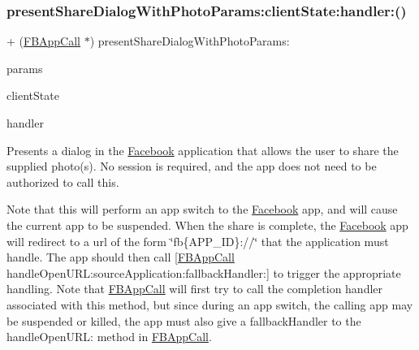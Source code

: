 \subsubsection{\texorpdfstring{present\+Share\+Dialog\+With\+Photo\+Params\+:client\+State\+:handler\+:()}{presentShareDialogWithPhotoParams:clientState:handler:()}\hspace{0.1cm}{\footnotesize\ttfamily [2/5]}}
{\footnotesize\ttfamily + (\hyperlink{interfaceFBAppCall}{F\+B\+App\+Call} $\ast$) present\+Share\+Dialog\+With\+Photo\+Params\+: \begin{DoxyParamCaption}\item[{(\hyperlink{interfaceFBPhotoParams}{F\+B\+Photo\+Params} $\ast$)}]{params }\item[{clientState:(N\+S\+Dictionary $\ast$)}]{client\+State }\item[{handler:(F\+B\+Dialog\+App\+Call\+Completion\+Handler)}]{handler }\end{DoxyParamCaption}}

Presents a dialog in the \hyperlink{interfaceFacebook}{Facebook} application that allows the user to share the supplied photo(s). No session is required, and the app does not need to be authorized to call this.

Note that this will perform an app switch to the \hyperlink{interfaceFacebook}{Facebook} app, and will cause the current app to be suspended. When the share is complete, the \hyperlink{interfaceFacebook}{Facebook} app will redirect to a url of the form \char`\"{}fb\{\+A\+P\+P\+\_\+\+I\+D\}\+://\char`\"{} that the application must handle. The app should then call \mbox{[}\hyperlink{interfaceFBAppCall}{F\+B\+App\+Call} handle\+Open\+U\+R\+L\+:source\+Application\+:fallback\+Handler\+:\mbox{]} to trigger the appropriate handling. Note that \hyperlink{interfaceFBAppCall}{F\+B\+App\+Call} will first try to call the completion handler associated with this method, but since during an app switch, the calling app may be suspended or killed, the app must also give a fallback\+Handler to the handle\+Open\+U\+RL\+: method in \hyperlink{interfaceFBAppCall}{F\+B\+App\+Call}.


